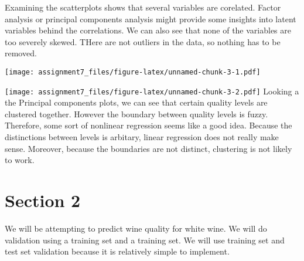 \documentclass[]{article}
\newenvironment{Shaded}{\begin{snugshade}}{\end{snugshade}}
\newcommand{\KeywordTok}[1]{\textcolor[rgb]{0.13,0.29,0.53}{\textbf{#1}}}
\newcommand{\DataTypeTok}[1]{\textcolor[rgb]{0.13,0.29,0.53}{#1}}
\newcommand{\DecValTok}[1]{\textcolor[rgb]{0.00,0.00,0.81}{#1}}
\newcommand{\StringTok}[1]{\textcolor[rgb]{0.31,0.60,0.02}{#1}}
\newcommand{\OperatorTok}[1]{\textcolor[rgb]{0.81,0.36,0.00}{\textbf{#1}}}
\newcommand{\NormalTok}[1]{#1}
\begin{document}
Examining the scatterplots shows that several variables are corelated.
Factor analysis or principal components analysis might provide some
insights into latent variables behind the correlations. We can also see
that none of the variables are too severely skewed. THere are not
outliers in the data, so nothing has to be removed.

\begin{Shaded}
\end{Shaded}

\texttt{[image: assignment7\_files/figure-latex/unnamed-chunk-3-1.pdf]}

\begin{Shaded}
\end{Shaded}

\texttt{[image: assignment7\_files/figure-latex/unnamed-chunk-3-2.pdf]}
Looking a the Principal components plots, we can see that certain
quality levels are clustered together. However the boundary between
quality levels is fuzzy. Therefore, some sort of nonlinear regression
seems like a good idea. Because the distinctions between levels is
arbitary, linear regression does not really make sense. Moreover,
because the boundaries are not distinct, clustering is not likely to
work.

\section{Section 2}\label{section-2}

We will be attempting to predict wine quality for white wine. We will do
validation using a training set and a training set. We will use training
set and test set validation because it is relatively simple to
implement.
\end{document}
